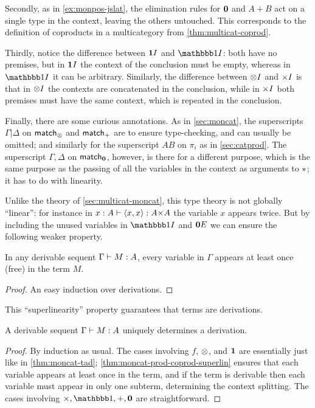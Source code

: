 Secondly, as in \cref{ex:monpos-jslat}, the elimination rules for $\mathbf{0}$ and $A+B$ act on a single type in the context, leaving the others untouched.
This corresponds to the definition of coproducts in a multicategory from \cref{thm:multicat-coprod}.

Thirdly, notice the difference between $\mathbf{1} I$ and $\unit I$: both have no premises, but in $\mathbf{1} I$ the context of the conclusion must be empty, whereas in $\unit I$ it can be arbitrary.
Similarly, the difference between $\mathord{\otimes}I$ and $\timesI$ is that in $\mathord{\otimes}I$ the contexts are concatenated in the conclusion, while in $\timesI$ both premises must have the same context, which is repeated in the conclusion.

Finally, there are some curious annotations.
As in \cref{sec:moncat}, the superscripts $\Gamma|\Delta$ on $\mathsf{match}_\otimes$ and $\mathsf{match}_+$ are to ensure type-checking, and can usually be omitted; and similarly for the superscript $AB$ on $\pi_i$ as in \cref{sec:catprod}.
The superscript $\Gamma,\Delta$ on $\mathsf{match}_{\mathbf{0}}$, however, is there for a different purpose, which is the same purpose as the passing of all the variables in the context as arguments to $\mathord{\ast}$; it has to do with linearity.

Unlike the theory of \cref{sec:multicat-moncat}, this type theory is not globally ``linear'': for instance in $x:A \types \pair x x : A\times A$ the variable $x$ appears twice.
But by including the unused variables in $\unit I$ and $\mathbf{0} E$ we can ensure the following weaker property.

\begin{lem}\label{thm:moncat-prod-coprod-superlin}
  In any derivable sequent $\Gamma\vdash M:A$, every variable in $\Gamma$ appears at least once (free) in the term $M$.
\end{lem}
\begin{proof}
  An easy induction over derivations.
\end{proof}

This ``superlinearity'' property guarantees that terms are derivations.

\begin{lem}\label{thm:moncat-prod-coprod-tad}
  A derivable sequent $\Gamma\vdash M:A$ uniquely determines a derivation.
\end{lem}
\begin{proof}
  By induction as usual.
  The cases involving $f$, $\otimes$, and $\mathbf{1}$ are essentially just like in \cref{thm:moncat-tad}; \cref{thm:moncat-prod-coprod-superlin} ensures that each variable appears at least once in the term, and if the term is derivable then each variable must appear in only one subterm, determining the context splitting.
  The cases involving $\times,\unit,+,\zero$ are straightforward.
\end{proof}

